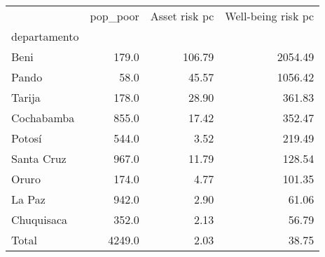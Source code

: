 \begin{tabular}{lrrr}
\toprule
{} &  pop\_poor &  Asset risk pc &  Well-being risk pc \\
departamento &           &                &                     \\
\midrule
Beni         &     179.0 &         106.79 &             2054.49 \\
Pando        &      58.0 &          45.57 &             1056.42 \\
Tarija       &     178.0 &          28.90 &              361.83 \\
Cochabamba   &     855.0 &          17.42 &              352.47 \\
Potosí       &     544.0 &           3.52 &              219.49 \\
Santa Cruz   &     967.0 &          11.79 &              128.54 \\
Oruro        &     174.0 &           4.77 &              101.35 \\
La Paz       &     942.0 &           2.90 &               61.06 \\
Chuquisaca   &     352.0 &           2.13 &               56.79 \\
Total        &    4249.0 &           2.03 &               38.75 \\
\bottomrule
\end{tabular}

